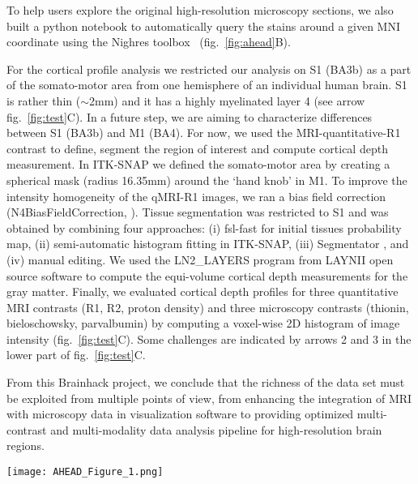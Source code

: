 \documentclass[../main.tex]{subfiles}
\begin{document}
To help users explore the original high-resolution microscopy sections, we also built a python notebook to automatically query the stains around a given MNI coordinate using the Nighres toolbox~\parencite{huntenburg_nighres_2018} (fig.~\ref{fig:ahead}B).

For the cortical profile analysis we restricted our analysis on S1 (BA3b) as a part of the somato-motor area from one hemisphere of an individual human brain. S1 is rather thin (\(\sim\)2mm) and it has a highly myelinated layer 4 (see arrow fig.~\ref{fig:test}C). In a future step, we are aiming to characterize differences between S1 (BA3b) and M1 (BA4). For now, we used the MRI-quantitative-R1 contrast to define, segment the region of interest and compute cortical depth measurement. In ITK-SNAP \parencite{Yushkevich2006} we defined the somato-motor area by creating a spherical mask (radius 16.35mm) around the ‘hand knob’ in M1. To improve the intensity homogeneity of the qMRI-R1 images, we ran a bias field correction (N4BiasFieldCorrection, \parencite{Cox1996}). Tissue segmentation was restricted to S1 and was obtained by combining four approaches: (i) fsl-fast \parencite{Smith2004} for initial tissues probability map, (ii) semi-automatic histogram fitting in ITK-SNAP, (iii) Segmentator \parencite{Gulban2018}, and (iv) manual editing. We used the LN2\_LAYERS program from LAYNII open source software \parencite{Huber2021}  to compute the equi-volume cortical depth measurements for the gray matter. Finally, we evaluated cortical depth profiles for three quantitative MRI contrasts (R1, R2, proton density) and three microscopy contrasts (thionin, bieloschowsky, parvalbumin) by computing a voxel-wise 2D histogram of image intensity (fig.~\ref{fig:test}C). Some challenges are indicated by arrows 2 and 3 in the lower part of fig.~\ref{fig:test}C.

From this Brainhack project, we conclude that the richness of the data set must be exploited from multiple points of view, from enhancing the integration of MRI with microscopy data in visualization software to providing optimized multi-contrast and multi-modality data analysis pipeline for high-resolution brain regions.

\printbibliography


\begin{figure*}
	\centering
	\texttt{[image: AHEAD\_Figure\_1.png]}
	\caption{A) Neuroglancer visualization, B) section query notebook, C) Cortical ROI and corresponding depth histograms extracted from the different contrasts available.
	}
	\label{fig:ahead}
\end{figure*}
\end{document}
